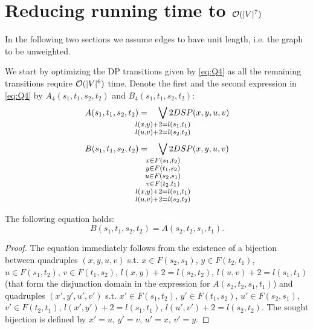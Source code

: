 \section{Reducing running time to $\mathcal{O}(|V|^7)$}

In the following two sections we assume edges to have unit length, i.e. the graph to be unweighted.

We start by optimizing the DP transitions given by \eqref{eq:Q4} as all the remaining transitions require $\mathcal{O}(|V|^6)$ time. Denote the first and the second expression in \eqref{eq:Q4} by $A_4(s_1, t_1, s_2, t_2)$ and $B_4(s_1, t_1, s_2, t_2)$:
\begin{align} \label{eq:A}
    A(s_1, t_1, s_2, t_2) = \quad
        \smashoperator{\bigvee_{
        \large \substack{
            l(x, y) + 2 = l(s_1, t_1)\\ 
            l(u, v) + 2 = l(s_2, t_2)
        }
        }} 2DSP(x, y, u, v) \\
\end{align}
\begin{align} \label{eq:B}
   B(s_1, t_1, s_2, t_2) = \quad
        \smashoperator{\bigvee_{
        \large \substack{
            x \in F(s_1, t_2)\\ 
            y \in F(t_1, s_2)\\ 
            u \in F(s_2, s_1)\\ 
            v \in F(t_2, t_1)\\ 
            l(x, y) + 2 = l(s_1, t_1)\\ 
            l(u, v) + 2 = l(s_2, t_2)
        }
        }} 2DSP(x, y, u, v) \\
\end{align}
\begin{proposition}
The following equation holds:
\begin{equation}
    B(s_1, t_1, s_2, t_2) = A(s_2, t_2, s_1, t_1).
\end{equation}
\end{proposition}
\begin{proof}
The equation immediately follows from the existence of a bijection between quadruples $(x, y, u, v)$ s.t. $x \in F(s_2, s_1)$, $y \in F(t_2, t_1)$, $u \in F(s_1, t_2)$, $v \in F(t_1, s_2)$, $l(x, y) + 2 = l(s_2, t_2)$, $l(u, v) + 2 = l(s_1, t_1)$ (that form the disjunction domain in the expression for $A(s_2, t_2, s_1, t_1)$) and quadruples $(x', y', u', v')$ s.t. $x' \in F(s_1, t_2)$, $y' \in F(t_1, s_2)$, $u' \in F(s_2, s_1)$, $v' \in F(t_2, t_1)$, $l(x', y') + 2 = l(s_1, t_1)$, $l(u', v') + 2 = l(s_2, t_2)$. The sought bijection is defined by $x' = u$, $y' = v$, $u' = x$, $v' = y$.
\end{proof}

